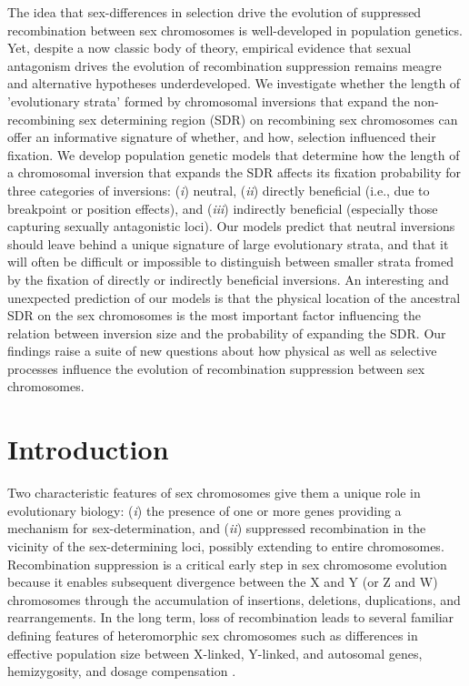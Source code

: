 \documentclass{article}
\begin{document}
\noindent{} The idea that sex-differences in selection drive the evolution of suppressed recombination between sex chromosomes is well-developed in population genetics. Yet, despite a now classic body of theory, empirical evidence that sexual antagonism drives the evolution of recombination suppression remains meagre and alternative hypotheses underdeveloped. We investigate whether the length of 'evolutionary strata' formed by chromosomal inversions that expand the non-recombining sex determining region (SDR) on recombining sex chromosomes can offer an informative signature of whether, and how, selection influenced their fixation. We develop population genetic models that determine how the length of a chromosomal inversion that expands the SDR affects its fixation probability for three categories of inversions: ({\itshape i}) neutral, ({\itshape ii}) directly beneficial (i.e., due to breakpoint or position effects), and ({\itshape iii}) indirectly beneficial (especially those capturing sexually antagonistic loci). Our models predict that neutral inversions should leave behind a unique signature of large evolutionary strata, and that it will often be difficult or impossible to distinguish between smaller strata fromed by the fixation of directly or indirectly beneficial inversions. An interesting and unexpected prediction of our models is that the physical location of the ancestral SDR on the sex chromosomes is the most important factor influencing the relation between inversion size and the probability of expanding the SDR. Our findings raise a suite of new questions about how physical as well as selective processes influence the evolution of recombination suppression between sex chromosomes.
\newpage{}


\section*{Introduction} \label{sec:Introduction}

Two characteristic features of sex chromosomes give them a unique role in evolutionary biology: ({\itshape i}) the presence of one or more genes providing a mechanism for sex-determination, and ({\itshape ii}) suppressed recombination in the vicinity of the sex-determining loci, possibly extending to entire chromosomes. Recombination suppression is a critical early step in sex chromosome evolution because it enables subsequent divergence between the X and Y (or Z and W) chromosomes through the accumulation of insertions, deletions, duplications, and rearrangements. In the long term, loss of recombination leads to several familiar defining features of heteromorphic sex chromosomes such as differences in effective population size between X-linked, Y-linked, and autosomal genes, hemizygosity, and dosage compensation \citep{CharlesworthMarais2005, BergeroCharlesworth2009,BeukeboomPerrin2014}.
	
\end{document}
